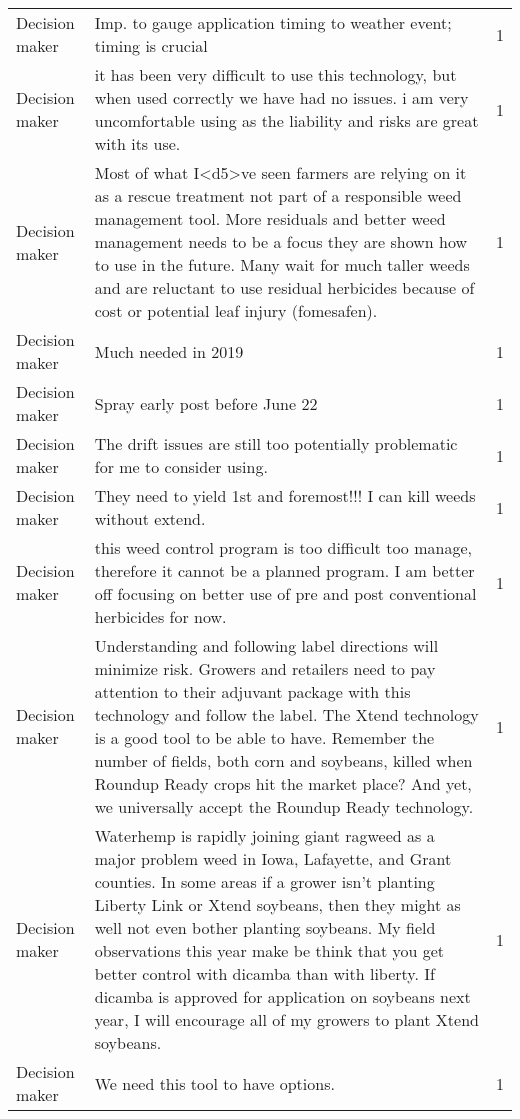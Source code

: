 \documentclass[]{article}
\begin{document}
\begin{table}[H]
\begin{tabular}{llr}
\addlinespace
Decision maker & Imp. to gauge application timing to weather event; timing is crucial & 1\\
Decision maker & it has been very difficult to use this technology, but when used correctly we have had no issues.  i am very uncomfortable using as the liability and risks are great with its use. & 1\\
Decision maker & Most of what I<d5>ve seen farmers are relying on it as a rescue treatment not part of a responsible weed management tool.  More residuals and better weed management needs to be a focus they are shown how to use in the future. Many wait for much taller weeds and are reluctant to use residual herbicides because of cost or potential leaf injury (fomesafen). & 1\\
Decision maker & Much needed in 2019 & 1\\
Decision maker & Spray early post before June 22 & 1\\
\addlinespace
Decision maker & The drift issues are still too potentially problematic for me to consider using. & 1\\
Decision maker & They need to yield 1st and foremost!!!  I can kill weeds without extend. & 1\\
Decision maker & this weed control program is too difficult too manage, therefore it cannot be a planned program.    I am better off focusing on better use of pre and post conventional herbicides for now. & 1\\
Decision maker & Understanding and following label directions will minimize risk.  Growers and retailers need to pay attention to their adjuvant package with this technology and follow the label.  The Xtend technology is a good tool to be able to have.  Remember the number of fields, both corn and soybeans, killed when Roundup Ready crops hit the market place?  And yet, we universally accept the Roundup Ready technology. & 1\\
Decision maker & Waterhemp is rapidly joining giant ragweed as a major problem weed in Iowa, Lafayette, and Grant counties. In some areas if a grower isn't planting Liberty Link or Xtend soybeans, then they might as well not even bother planting soybeans. My field observations this year make be think that you get better control with dicamba than with liberty. If dicamba is approved for application on soybeans next year, I will encourage all of my growers to plant Xtend soybeans. & 1\\
\addlinespace
Decision maker & We need this tool to have options. & 1\\

\end{tabular}
\end{table}
\end{document}
